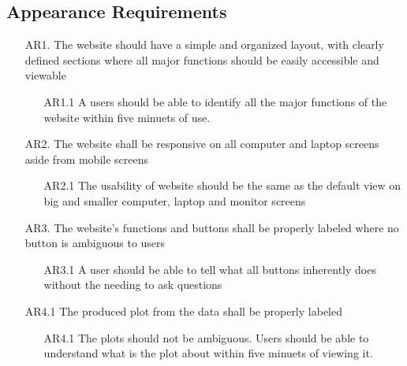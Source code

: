 \documentclass[12pt]{article}
\begin{document}
\subsection{Appearance Requirements}
\begin{itemize}
  \item [AR1.]The website should have a simple and organized layout, with
  clearly defined sections where all major functions should be easily accessible
  and viewable 
  \begin{itemize}
    \item[AR1.1] A users should be able to identify all the major
    functions of the website within five minuets of use.
  \end{itemize}
  \item [AR2.] The website shall be responsive on all computer and laptop screens
  aside from mobile screens
  \begin{itemize}
    \item [AR2.1] The usability of website should be the same
    as the default view on big and smaller computer, laptop and monitor screens
  \end{itemize}
  \item [AR3.] The website's functions and buttons shall be properly labeled
  where no button is ambiguous to users 
  \begin{itemize}
    \item [AR3.1] A user should be able to tell what all buttons inherently does
    without the needing to ask questions
  \end{itemize}
  \item [AR4.1]The produced plot from the data shall be properly labeled
  \begin{itemize}
    \item [AR4.1] The plots should not be ambiguous. Users should be able to understand
    what is the plot about within five minuets of viewing it.
  \end{itemize}
  \subitem
\end{itemize}
\end{document}
